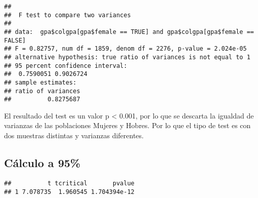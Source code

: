 \documentclass[
]{article}
\newenvironment{Shaded}{\begin{snugshade}}{\end{snugshade}}
\newcommand{\AttributeTok}[1]{\textcolor[rgb]{0.80,0.80,0.80}{#1}}
\newcommand{\CommentTok}[1]{\textcolor[rgb]{0.50,0.62,0.50}{#1}}
\newcommand{\ConstantTok}[1]{\textcolor[rgb]{0.86,0.64,0.64}{\textbf{#1}}}
\newcommand{\FunctionTok}[1]{\textcolor[rgb]{0.94,0.94,0.56}{#1}}
\newcommand{\NormalTok}[1]{\textcolor[rgb]{0.80,0.80,0.80}{#1}}
\newcommand{\SpecialCharTok}[1]{\textcolor[rgb]{0.86,0.64,0.64}{#1}}
\newcommand{\StringTok}[1]{\textcolor[rgb]{0.80,0.58,0.58}{#1}}
\begin{document}
\begin{verbatim}
## 
##  F test to compare two variances
## 
## data:  gpa$colgpa[gpa$female == TRUE] and gpa$colgpa[gpa$female == FALSE]
## F = 0.82757, num df = 1859, denom df = 2276, p-value = 2.024e-05
## alternative hypothesis: true ratio of variances is not equal to 1
## 95 percent confidence interval:
##  0.7590051 0.9026724
## sample estimates:
## ratio of variances 
##          0.8275687
\end{verbatim}

El resultado del test es un valor p \textless{} 0.001, por lo que se
descarta la igualdad de varianzas de las poblaciones Mujeres y Hobres.
Por lo que el tipo de test es con dos muestras distintas y varianzas
diferentes.

\hypertarget{cuxe1lculo-a-95}{%
\subsection{Cálculo a 95\%}\label{cuxe1lculo-a-95}}

\begin{Shaded}
\end{Shaded}

\begin{verbatim}
##          t tcritical       pvalue
## 1 7.078735  1.960545 1.704394e-12
\end{verbatim}

\begin{Shaded}
\end{Shaded}
\end{document}
